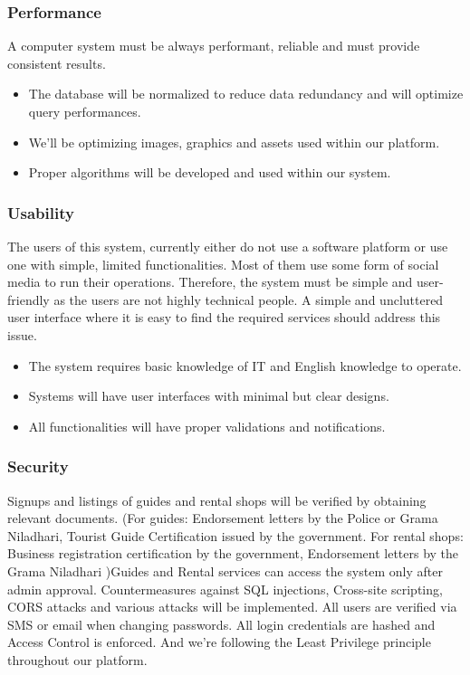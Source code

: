 \subsubsection{Performance}
A computer system must be always performant, reliable and must provide consistent results.
\begin{itemize}
    \item The database will be normalized to reduce data redundancy and will optimize query performances.
    \item We’ll be optimizing images, graphics and assets used within our platform.
    \item Proper algorithms will be developed and used within our system.
\end{itemize}

\subsubsection{Usability}
The users of this system, currently either do not use a software platform or use one with simple, limited functionalities. Most of them use some form of social media to run their operations.
Therefore, the system must be simple and user-friendly as the users are not highly technical people. A simple and uncluttered user interface where it is easy to find the required services should address this issue.
\begin{itemize}
    \item The system requires basic knowledge of IT and English knowledge to operate.
    \item Systems will have user interfaces with minimal but clear designs.
    \item All functionalities will have proper validations and notifications.
\end{itemize}

\subsubsection{Security}
Signups and listings of guides and rental shops will be verified by obtaining relevant documents. (For guides: Endorsement letters by the Police or Grama Niladhari, Tourist Guide Certification issued by the government. For rental shops: Business registration certification by the government, Endorsement letters by the Grama Niladhari )Guides and Rental services can access the system only after admin approval.
Countermeasures against SQL injections, Cross-site scripting, CORS attacks and various attacks will be implemented.
All users are verified via SMS or email when changing passwords. All login credentials are hashed and Access Control is enforced. And we’re following the Least Privilege principle throughout our platform.


